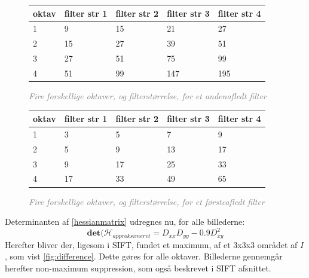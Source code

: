 \begin{figure}[H]
    \centering
    \begin{center}    
    \begin{tabular}{ | l | l | l | l | l |}
    \hline
    oktav & filter str 1 & filter str 2 & filter str 3 & filter str 4 \\ \hline
    1 & 9 & 15 & 21 & 27 \\ \hline
  	2 & 15 & 27 & 39 & 51 \\ \hline
  	3 & 27 & 51 & 75 & 99 \\ \hline
  	4 & 51 & 99 & 147 & 195 \\ \hline
    \end{tabular}       
    \caption{\textcolor{gray}{\footnotesize \textit{Fire forskellige oktaver, og filterstørrelse, for et andenafledt filter}}}
    \label{fig:secderivfiltersize}
     \end{center}
     \vspace{-2.5em}
  \end{figure} \noindent

\begin{figure}[H]
    \centering
    \begin{center}    
    \begin{tabular}{ | l | l | l | l | l |}
    \hline
    oktav & filter str 1 & filter str 2 & filter str 3 & filter str 4 \\ \hline
    1 & 3 & 5 & 7 & 9 \\ \hline
  	2 & 5 & 9 & 13 & 17 \\ \hline
  	3 & 9 & 17 & 25 & 33 \\ \hline
  	4 & 17 & 33 & 49 & 65 \\ \hline
    \end{tabular}       
    \caption{\textcolor{gray}{\footnotesize \textit{Fire forskellige oktaver, og filterstørrelse, for et førsteafledt filter}}}
    \label{fig:firstderivfiltersize}
     \end{center}
     \vspace{-2.5em}
  \end{figure} \noindent
Determinanten af \eqref{hessianmatrix} udregnes nu, for alle billederne:
\begin{equation}
\textbf{det}(\mathcal{H}_{approksimeret} = D_{xx}D_{yy}-0.9D_{xy}^2
\label{deerminantofhessian}
\end{equation}
Herefter bliver der, ligesom i SIFT, fundet et maximum, af et 3x3x3 området af $I$, som vist \eqref{fig:difference}. Dette gøres for alle oktaver. Billederne gennemgår herefter non-maximum suppression, som også beskrevet i SIFT afsnittet.

